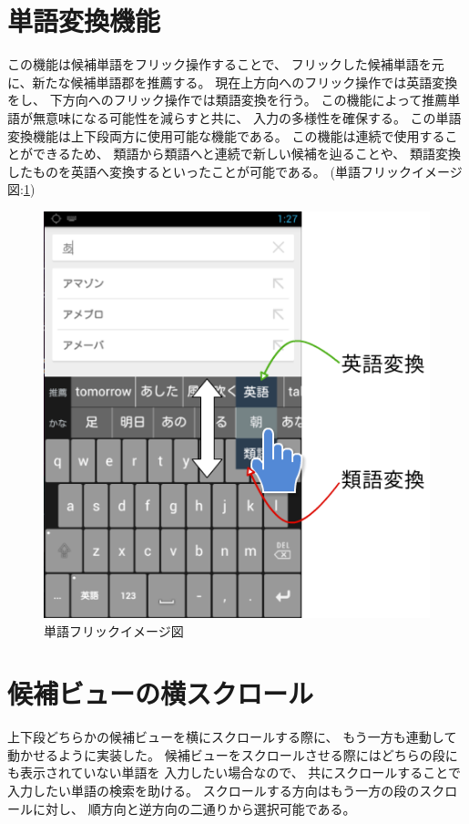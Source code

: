 \section{単語変換機能}
\label{wordflick}
この機能は候補単語をフリック操作することで、
フリックした候補単語を元に、新たな候補単語郡を推薦する。
現在上方向へのフリック操作では英語変換をし、
下方向へのフリック操作では類語変換を行う。
この機能によって推薦単語が無意味になる可能性を減らすと共に、
入力の多様性を確保する。
この単語変換機能は上下段両方に使用可能な機能である。
この機能は連続で使用することができるため、
類語から類語へと連続で新しい候補を辿ることや、
類語変換したものを英語へ変換するといったことが可能である。
(単語フリックイメージ図:\ref{fig:wordflick})
\begin{figure}[htbp]
  \begin{center}
    \includegraphics[width=14cm,bb=0 0 461 485]{images/candidateflick.png}
  \end{center}
  \caption{単語フリックイメージ図}
  \label{fig:wordflick}
\end{figure}

\section{候補ビューの横スクロール}
上下段どちらかの候補ビューを横にスクロールする際に、
もう一方も連動して動かせるように実装した。
候補ビューをスクロールさせる際にはどちらの段にも表示されていない単語を
入力したい場合なので、
共にスクロールすることで入力したい単語の検索を助ける。
スクロールする方向はもう一方の段のスクロールに対し、
順方向と逆方向の二通りから選択可能である。

